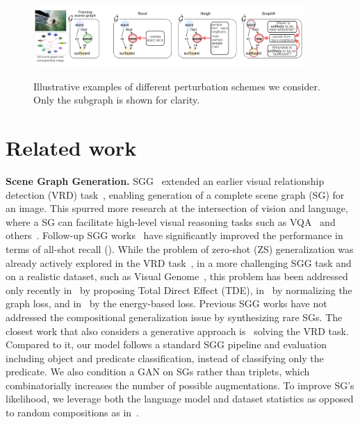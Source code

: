 \begin{figure}[t]
	\centering
	\vspace{-5pt}
	\centering
	{\includegraphics[width=0.92\textwidth,trim={0 0.3cm 0 0.2cm},clip]{perturbations.pdf}}
	\vspace{-1pt}
	\caption{\small Illustrative examples of different perturbation schemes we consider. Only the subgraph is shown for clarity. }
	\vspace{-10pt}
	\label{fig:perturb}
\end{figure}

\section{Related work}\label{sec:related}
\vspace{-5pt}

\textbf{Scene Graph Generation.} SGG~\citep{xu2017scene} extended an earlier visual relationship detection (VRD) task~\citep{lu2016visual,sadeghi2011recognition}, enabling generation of a complete scene graph (SG) for an image.
This spurred more research at the intersection of vision and language, where a SG can facilitate high-level visual reasoning tasks such as VQA~\citep{zhang2019empirical,NSM2019,shi2019explainable} and others~\citep{agarwal2020visual,xu2020survey,raboh2020differentiable}.
Follow-up SGG works~\citep{li2017scene,yang2018graph, zellers2018neural,zhang2019graphical,gu2019scene,tang2019learning,lu2019learning,lu2021multi} have significantly improved the performance in terms of all-shot recall (\fig{\ref{fig:history}}).
While the problem of zero-shot (ZS) generalization was already actively explored in the VRD task~\citep{zhang2017visual,yang2018shuffle,wang2019generating}, in a more challenging SGG task and on a realistic dataset, such as Visual Genome~\citep{krishna2017visual}, this problem has been addressed only recently in~\citep{tang2020unbiased} 
by proposing Total Direct Effect (TDE), in~\citep{knyazev2020graph} by normalizing the graph loss, and in~\citep{suhail2021energy} by the energy-based loss.
Previous SGG works have not addressed the compositional generalization issue by synthesizing rare SGs.
The closest work that also considers a generative approach is~\citep{wang2019generating} solving the VRD task. Compared to it, our model follows a standard SGG pipeline and evaluation~\citep{xu2017scene,zellers2018neural} including object and predicate classification, instead of classifying only the predicate.
We also condition a GAN on SGs rather than triplets, which combinatorially increases the number of possible augmentations.
To improve SG's likelihood, we leverage both the language model and dataset statistics as opposed to random compositions as in~\citep{wang2019generating}.


